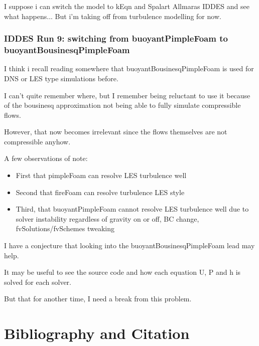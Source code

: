 \documentclass[12pt]{article}
\renewcommand{\_}{\kern-1.5pt\textunderscore\kern-1.5pt}
\begin{document}
I suppose i can switch the model to kEqn and Spalart Allmaras IDDES and see what happens... But i'm taking off from turbulence modelling for now. 

\section{IDDES Run 9: switching from buoyantPimpleFoam to buoyantBousinesqPimpleFoam}


I think i recall reading somewhere that buoyantBousinesqPimpleFoam is used for DNS or LES type simulations before. 


I can't quite remember where, but I remember being reluctant to use it because of the bousinesq approximation not being able to fully simulate compressible flows.


However, that now becomes irrelevant since the flows themselves are not compressible anyhow.


A few observations of note:


\begin{itemize}
	\item First that pimpleFoam can resolve LES turbulence well
	\item Second that fireFoam can resolve turbulence LES style
	\item Third, that buoyantPimpleFoam cannot resolve LES turbulence well due to solver instability regardless of gravity on or off, BC change, fvSolutions/fvSchemes tweaking
	
\end{itemize}


I have a conjecture that looking into the buoyantBousinesqPimpleFoam lead may help.


It may be useful to see the source code and how each equation U, P and h is solved for each solver.


But that for another time, I need a break from this problem. 

\vspace{\baselineskip}
\part{Bibliography and Citation}

\printbibliography
\end{document}

